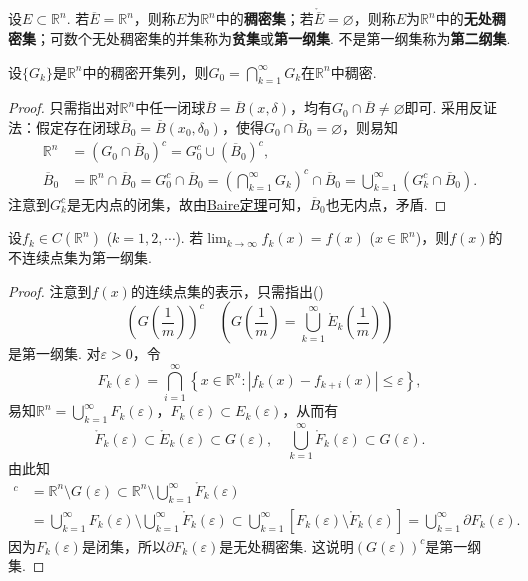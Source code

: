 \documentclass[../../main.tex]{subfiles}
\begin{document}
\begin{definition}
设$E\subset\mathbb{R}^n$. 若$\overline{E}=\mathbb{R}^n$，则称$E$为$\mathbb{R}^n$中的\textbf{稠密集}；若$\mathring{\overline{E}}=\varnothing$，则称$E$为$\mathbb{R}^n$中的\textbf{无处稠密集}；可数个无处稠密集的并集称为\textbf{贫集}或\textbf{第一纲集}. 不是第一纲集称为\textbf{第二纲集}.
\end{definition}

\begin{example}\label{example:例14}
设$\{G_k\}$是$\mathbb{R}^n$中的稠密开集列，则$G_0 = \bigcap_{k = 1}^{\infty}G_k$在$\mathbb{R}^n$中稠密.
\end{example}
\begin{proof}
只需指出对$\mathbb{R}^n$中任一闭球$\overline{B}=\overline{B}(x,\delta)$，均有$G_0\cap\overline{B}\neq\varnothing$即可. 采用反证法：假定存在闭球$\overline{B}_0=\overline{B}(x_0,\delta_0)$，使得$G_0\cap\overline{B}_0=\varnothing$，则易知
\begin{align*}
\mathbb{R}^n&=(G_0\cap\overline{B}_0)^c = G_0^c\cup(\overline{B}_0)^c,\\
\overline{B}_0&=\mathbb{R}^n\cap\overline{B}_0 = G_0^c\cap\overline{B}_0=\left(\bigcap_{k = 1}^{\infty}G_k\right)^c\cap\overline{B}_0=\bigcup_{k = 1}^{\infty}(G_k^c\cap\overline{B}_0).
\end{align*}
注意到$G_k^c$是无内点的闭集，故由\hyperref[theorem:Baire定理]{Baire定理}可知，$\overline{B}_0$也无内点，矛盾.

\end{proof}

\begin{example}\label{example:例15}
设$f_k\in C(\mathbb{R}^n)$ ($k = 1,2,\cdots$). 若$\lim_{k\to\infty}f_k(x)=f(x)$ ($x\in\mathbb{R}^n$)，则$f(x)$的不连续点集为第一纲集.
\end{example}
\begin{proof}
注意到$f(x)$的连续点集的表示，只需指出()
\[
\left(G\left(\frac{1}{m}\right)\right)^c \quad \left(G\left(\frac{1}{m}\right)=\bigcup_{k = 1}^{\infty}\mathring{E}_k\left(\frac{1}{m}\right)\right)
\]
是第一纲集. 对$\varepsilon>0$，令
\[
F_k(\varepsilon)=\bigcap_{i = 1}^{\infty}\left\{x\in\mathbb{R}^n: |f_k(x)-f_{k + i}(x)|\leqslant\varepsilon\right\},
\]
易知$\mathbb{R}^n=\bigcup_{k = 1}^{\infty}F_k(\varepsilon)$，$F_k(\varepsilon)\subset E_k(\varepsilon)$，从而有
\[
\mathring{F}_k(\varepsilon)\subset\mathring{E}_k(\varepsilon)\subset G(\varepsilon), \quad \bigcup_{k = 1}^{\infty}\mathring{F}_k(\varepsilon)\subset G(\varepsilon).
\]
由此知
\begin{align*}
[G(\varepsilon)]^c&=\mathbb{R}^n\setminus G(\varepsilon)\subset\mathbb{R}^n\setminus\bigcup_{k = 1}^{\infty}\mathring{F}_k(\varepsilon)\\
&=\bigcup_{k = 1}^{\infty}F_k(\varepsilon)\setminus\bigcup_{k = 1}^{\infty}\mathring{F}_k(\varepsilon)\subset\bigcup_{k = 1}^{\infty}[F_k(\varepsilon)\setminus\mathring{F}_k(\varepsilon)]=\bigcup_{k = 1}^{\infty}\partial F_k(\varepsilon).
\end{align*}
因为$F_k(\varepsilon)$是闭集，所以$\partial F_k(\varepsilon)$是无处稠密集. 这说明$(G(\varepsilon))^c$是第一纲集. 

\end{proof}
\end{document}
